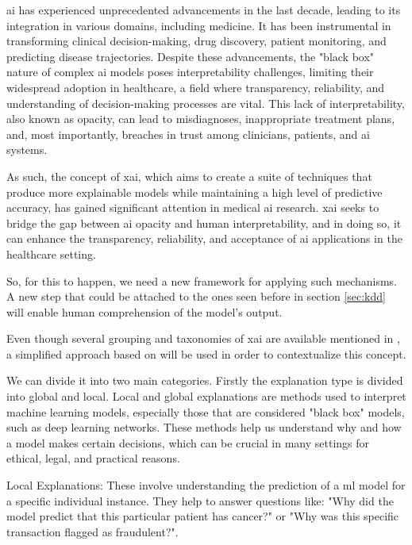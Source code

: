 \ac{ai} has experienced unprecedented advancements in the last decade, leading to its integration in various domains, including medicine. It has been instrumental in transforming clinical decision-making, drug discovery, patient monitoring, and predicting disease trajectories. Despite these advancements, the "black box" nature of complex \ac{ai} models poses interpretability challenges, limiting their widespread adoption in healthcare, a field where transparency, reliability, and understanding of decision-making processes are vital. This lack of interpretability, also known as opacity, can lead to misdiagnoses, inappropriate treatment plans, and, most importantly, breaches in trust among clinicians, patients, and \ac{ai} systems.

As such, the concept of \ac{xai}, which aims to create a suite of techniques that produce more explainable models while maintaining a high level of predictive accuracy, has gained significant attention in medical \ac{ai} research. \ac{xai} seeks to bridge the gap between \ac{ai} opacity and human interpretability, and in doing so, it can enhance the transparency, reliability, and acceptance of \ac{ai} applications in the healthcare setting.

So, for this to happen, we need a new framework for applying such mechanisms. A new step that could be attached to the ones seen before in section \ref{sec:kdd} will enable human comprehension of the model's output.

Even though several grouping and taxonomies of \ac{xai} are available mentioned in \cite{adadiPeekingBlackBoxSurvey2018,linardatosExplainableAIReview2020,barredoarrietaExplainableArtificialIntelligence2020,linardatosExplainableAIReview2020,kamath2021explainable}, a simplified approach based on \cite{kamath2021explainable} will be used in order to contextualize this concept.

We can divide it into two main categories. Firstly the explanation type is divided into global and local. Local and global explanations are methods used to interpret machine learning models, especially those that are considered "black box" models, such as deep learning networks. These methods help us understand why and how a model makes certain decisions, which can be crucial in many settings for ethical, legal, and practical reasons.

Local Explanations: These involve understanding the prediction of a \ac{ml} model for a specific individual instance. They help to answer questions like: "Why did the model predict that this particular patient has cancer?" or "Why was this specific transaction flagged as fraudulent?". 


